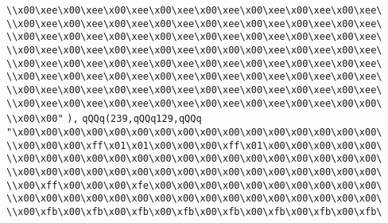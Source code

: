 \verb|\\x00\xee\x00\xee\x00\xee\x00\xee\x00\xee\x00\xee\x00\xee\x00\xee\|\newline
\verb|\\x00\xee\x00\xee\x00\xee\x00\xee\x00\xee\x00\xee\x00\xee\x00\xee\|\newline
\verb|\\x00\xee\x00\xee\x00\xee\x00\xee\x00\xee\x00\xee\x00\xee\x00\xee\|\newline
\verb|\\x00\xee\x00\xee\x00\xee\x00\xee\x00\x00\x00\xee\x00\xee\x00\xee\|\newline
\verb|\\x00\xee\x00\xee\x00\xee\x00\xee\x00\xee\x00\xee\x00\xee\x00\xee\|\newline
\verb|\\x00\xee\x00\xee\x00\xee\x00\xee\x00\xee\x00\xee\x00\xee\x00\xee\|\newline
\verb|\\x00\xee\x00\xee\x00\xee\x00\xee\x00\xee\x00\xee\x00\xee\x00\xee\|\newline
\verb|\\x00\xee\x00\xee\x00\xee\x00\xee\x00\xee\x00\xee\x00\xee\x00\x00\|\newline
\verb|\\x00\x00"|\newline
\verb|),|\newline
\verb|qQQq(239,qQQq129,qQQq|\newline
\verb|"\x00\x00\x00\x00\x00\x00\x00\x00\x00\x00\x00\x00\x00\x00\x00\x00\|\newline
\verb|\\x00\x00\x00\xff\x01\x01\x00\x00\x00\xff\x01\x00\x00\x00\x00\x00\|\newline
\verb|\\x00\x00\x00\x00\x00\x00\x00\x00\x00\x00\x00\x00\x00\x00\x00\x00\|\newline
\verb|\\x00\x00\x00\x00\x00\x00\x00\x00\x00\x00\x00\x00\x00\x00\x00\x00\|\newline
\verb|\\x00\xff\x00\x00\x00\xfe\x00\x00\x00\x00\x00\x00\x00\x00\x00\x00\|\newline
\verb|\\x00\x00\x00\x00\x00\x00\x00\x00\x00\x00\x00\x00\x00\x00\x00\x00\|\newline
\verb|\\x00\xfb\x00\xfb\x00\xfb\x00\xfb\x00\xfb\x00\xfb\x00\xfb\x00\xfb\|\newline
